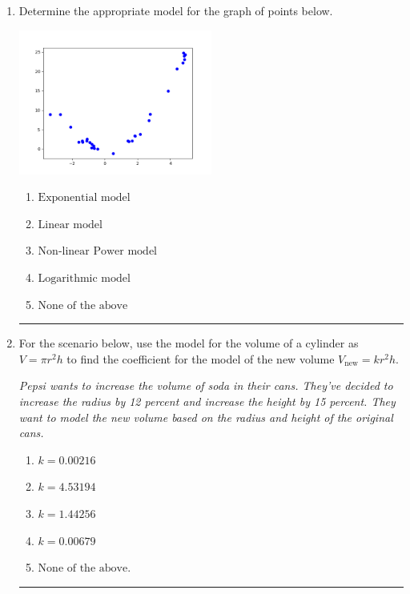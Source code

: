 \documentclass[14pt]{extbook}
\newcommand{\litem}[1]{\item#1\hspace*{-1cm}\rule{\textwidth}{0.4pt}}
\begin{document}
\begin{enumerate}
{\begin{enumerate}[label=\Alph*.]
\end{enumerate} }
\litem{
Determine the appropriate model for the graph of points below.
\begin{center}
    \includegraphics[width=0.5\textwidth]{../Figures/identifyModelGraph12A.png}
\end{center}
\begin{enumerate}[label=\Alph*.]
\item \( \text{Exponential model} \)
\item \( \text{Linear model} \)
\item \( \text{Non-linear Power model} \)
\item \( \text{Logarithmic model} \)
\item \( \text{None of the above} \)

\end{enumerate} }
\litem{
For the scenario below, use the model for the volume of a cylinder as $V = \pi r^2 h$ to find the coefficient for the model of the new volume $V_{\text{new}} = k r^2 h$.
\begin{center}
    \textit{ Pepsi wants to increase the volume of soda in their cans. They've decided to increase the radius by 12 percent and increase the height by 15 percent. They want to model the new volume based on the radius and height of the original cans. }
\end{center}
\begin{enumerate}[label=\Alph*.]
\item \( k = 0.00216 \)
\item \( k = 4.53194 \)
\item \( k = 1.44256 \)
\item \( k = 0.00679 \)
\item \( \text{None of the above.} \)


\end{enumerate}}
\end{enumerate}
\end{document}
